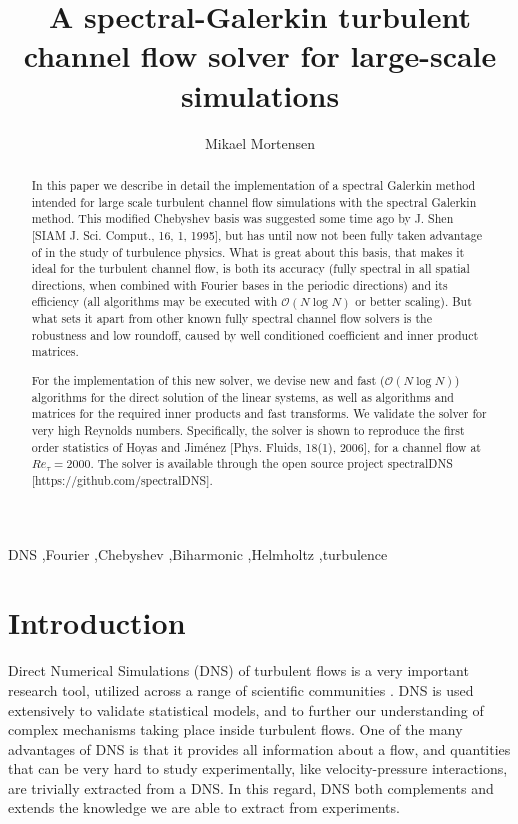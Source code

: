 \documentclass[preprint]{elsarticle}
\begin{document}
\begin{frontmatter}

\title{A spectral-Galerkin turbulent channel flow solver for large-scale simulations}
\author[mmo]{Mikael Mortensen}
\address[mmo]{Department of Mathematics, Division of Mechanics, University of Oslo}

\begin{abstract}
In this paper we describe in detail the implementation of a spectral Galerkin method intended for large scale turbulent channel flow simulations with the spectral Galerkin method. This modified Chebyshev basis was suggested some time ago by J. Shen [SIAM J. Sci. Comput., 16, 1, 1995], but has until now not been fully taken advantage of in the study of turbulence physics. What is great about this basis, that makes it ideal for the turbulent channel flow, is both its accuracy (fully spectral in all spatial directions, when combined with Fourier bases in the periodic directions) and its efficiency (all algorithms may be executed with $\mathcal{O}(N\log N)$ or better scaling). But what sets it apart from other known fully spectral channel flow solvers is the robustness and low roundoff, caused by well conditioned coefficient and inner product matrices.

For the implementation of this new solver, we devise new and fast ($\mathcal{O}(N\log N)$) algorithms for the direct solution of the linear systems, as well as algorithms and matrices for the required inner products and fast transforms. We validate the solver for very high Reynolds numbers. Specifically, the solver is shown to reproduce the first order statistics of Hoyas and Jim\'{e}nez [Phys. Fluids, 18(1), 2006], for a channel flow at $Re_{\tau}=2000$. The solver is available through the open source project spectralDNS [https://github.com/spectralDNS].


\end{abstract}
\begin{keyword}
DNS \sep Fourier \sep Chebyshev \sep Biharmonic \sep Helmholtz \sep turbulence
\end{keyword}

\end{frontmatter}
\section{Introduction}
Direct Numerical Simulations (DNS) of turbulent flows is a very important research tool, utilized across a range of scientific communities \cite{Moin98}. DNS is used extensively to validate statistical models, and to further our understanding of complex mechanisms taking place inside turbulent flows. One of the many advantages of DNS is that it provides all information about a flow, and quantities that can be very hard to study experimentally, like velocity-pressure interactions, are trivially extracted from a DNS. In this regard, DNS both complements and extends the knowledge we are able to extract from experiments.
\end{document}
